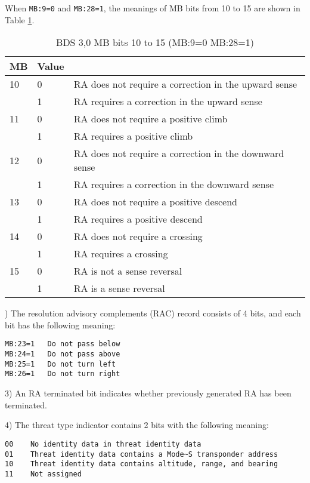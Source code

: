 When \texttt{MB:9=0} and \texttt{MB:28=1}, the meanings of MB bits from 10 to 15 are shown in Table \ref{tb:bds30_mb10-22_2}.

\begin{table}[]
\centering
\caption{BDS 3,0 MB bits 10 to 15 (MB:9=0 MB:28=1)}
\label{tb:bds30_mb10-22_2}
\begin{tabular}{|l|l|l|}
\hline
\textbf{MB} & \textbf{Value} & \textbf{} \\ \hline
10 & 0 & RA does not require a correction in the upward sense \\ \hline
 & 1 & RA requires a correction in the upward sense \\ \hline
11 & 0 & RA does not require a positive climb \\ \hline
 & 1 & RA requires a positive climb \\ \hline
12 & 0 & RA does not require a correction in the downward sense \\ \hline
 & 1 & RA requires a correction in the downward sense \\ \hline
13 & 0 & RA does not require a positive descend \\ \hline
 & 1 & RA requires a positive descend \\ \hline
14 & 0 & RA does not require a crossing \\ \hline
 & 1 & RA requires a crossing \\ \hline
15 & 0 & RA is not a sense reversal \\ \hline
 & 1 & RA is a sense reversal \\ \hline
\end{tabular}
\end{table}

) The resolution advisory complements (RAC) record consists of 4 bits, and each bit has the following meaning:

\begin{verbatim}
MB:23=1   Do not pass below
MB:24=1   Do not pass above
MB:25=1   Do not turn left
MB:26=1   Do not turn right
\end{verbatim}


3) An RA terminated bit indicates whether previously generated RA has been terminated.


4) The threat type indicator contains 2 bits with the following meaning:

\begin{verbatim}
00    No identity data in threat identity data
01    Threat identity data contains a Mode~S transponder address
10    Threat identity data contains altitude, range, and bearing
11    Not assigned
\end{verbatim}


